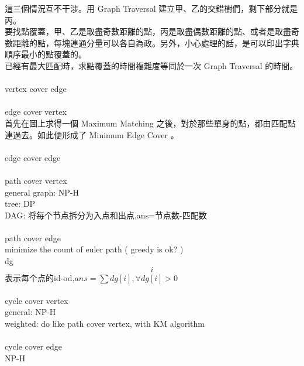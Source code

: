 這三個情況互不干涉。用 Graph Traversal 建立甲、乙的交錯樹們，剩下部分就是丙。\\
要找點覆蓋，甲、乙是取盡奇數距離的點，丙是取盡偶數距離的點、或者是取盡奇數距離的點，每塊連通分量可以各自為政。另外，小心處理的話，是可以印出字典順序最小的點覆蓋的。\\
已經有最大匹配時，求點覆蓋的時間複雜度等同於一次 Graph Traversal 的時間。\\
\\
vertex cover edge\\
\\
edge cover vertex\\
首先在圖上求得一個 Maximum Matching 之後，對於那些單身的點，都由匹配點連過去。如此便形成了 Minimum Edge Cover 。\\
\\
edge cover edge \\
\\
path cover vertex\\
general graph: NP-H\\
tree: DP\\
DAG: 将每个节点拆分为入点和出点,ans=节点数-匹配数\\
\\
path cover edge\\
minimize the count of euler path ( greedy is ok? )\\
dg\[i\]表示每个点的id-od,$ans=\sum dg[i], \forall dg[i]>0$\\
\\
cycle cover vertex\\
general: NP-H\\
weighted: do like path cover vertex, with KM algorithm\\
\\
cycle cover edge\\
NP-H\\
